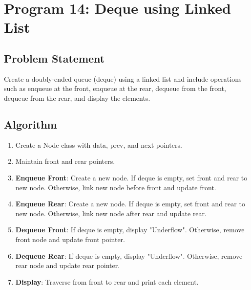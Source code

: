 \documentclass[a4paper,12pt]{article}
\begin{document}
\newpage

\section*{Program 14: Deque using Linked List}

\subsection*{Problem Statement}
Create a doubly-ended queue (deque) using a linked list and include operations such as enqueue at the front, enqueue at the rear, dequeue from the front, dequeue from the rear, and display the elements.

\subsection*{Algorithm}
\begin{enumerate}
    \item Create a Node class with data, prev, and next pointers.
    \item Maintain front and rear pointers.
    \item \textbf{Enqueue Front}: Create a new node. If deque is empty, set front and rear to new node. Otherwise, link new node before front and update front.
    \item \textbf{Enqueue Rear}: Create a new node. If deque is empty, set front and rear to new node. Otherwise, link new node after rear and update rear.
    \item \textbf{Dequeue Front}: If deque is empty, display "Underflow". Otherwise, remove front node and update front pointer.
    \item \textbf{Dequeue Rear}: If deque is empty, display "Underflow". Otherwise, remove rear node and update rear pointer.
    \item \textbf{Display}: Traverse from front to rear and print each element.
\end{enumerate}
\end{document}
